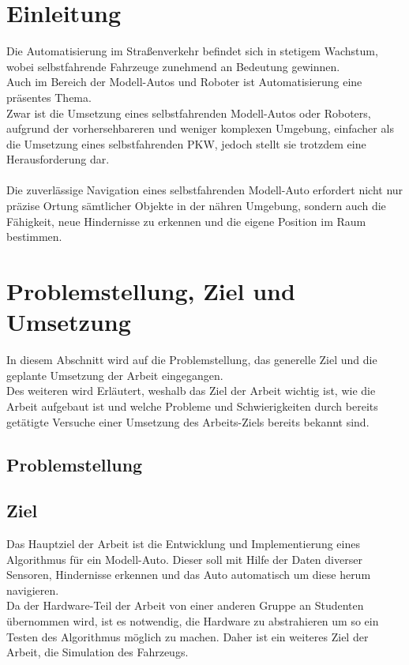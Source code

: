 \section{Einleitung}
Die Automatisierung im Straßenverkehr befindet sich in stetigem Wachstum, wobei selbstfahrende Fahrzeuge zunehmend an Bedeutung gewinnen. \\
Auch im Bereich der Modell-Autos und Roboter ist Automatisierung eine präsentes Thema. \\ 
Zwar ist die Umsetzung eines selbstfahrenden Modell-Autos oder Roboters, aufgrund der vorhersehbareren und weniger komplexen Umgebung, einfacher als die Umsetzung eines selbstfahrenden PKW, jedoch stellt sie trotzdem eine Herausforderung dar.
\\\\
Die zuverlässige Navigation eines selbstfahrenden Modell-Auto erfordert nicht nur präzise Ortung sämtlicher Objekte in der nähren Umgebung, sondern auch die Fähigkeit, neue Hindernisse zu erkennen und die eigene Position im Raum bestimmen.


\section{Problemstellung, Ziel und Umsetzung}
In diesem Abschnitt wird auf die Problemstellung, das generelle Ziel und die geplante Umsetzung der Arbeit eingegangen. \\
Des weiteren wird Erläutert, weshalb das Ziel der Arbeit wichtig ist, wie die Arbeit aufgebaut ist und welche Probleme und Schwierigkeiten durch bereits getätigte Versuche einer Umsetzung des Arbeits-Ziels bereits bekannt sind.

\subsection{Problemstellung}


\subsection{Ziel}
Das Hauptziel der Arbeit ist die Entwicklung und Implementierung eines Algorithmus für ein Modell-Auto. Dieser soll mit Hilfe der Daten diverser Sensoren, Hindernisse erkennen und das Auto automatisch um diese herum navigieren. \\
Da der Hardware-Teil der Arbeit von einer anderen Gruppe an Studenten übernommen wird, ist es notwendig, die Hardware zu abstrahieren um so ein Testen des Algorithmus möglich zu machen. Daher ist ein weiteres Ziel der Arbeit, die Simulation des Fahrzeugs.

